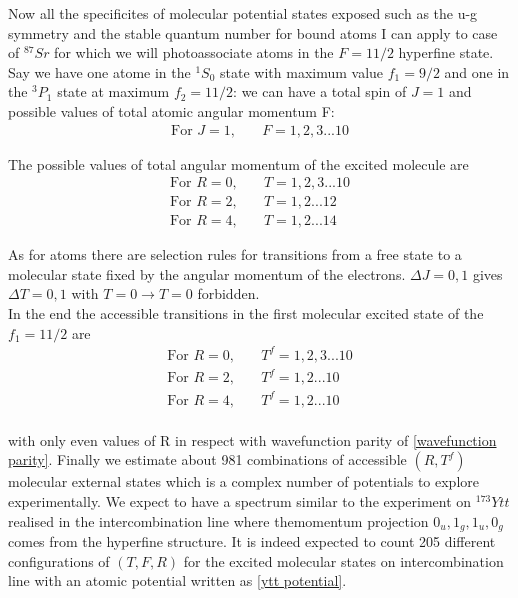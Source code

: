Now all the specificites of molecular potential states exposed such as the u-g symmetry and the stable quantum number for bound atoms
I can apply to case of $^{87}Sr$ for which we will photoassociate atoms in the $F=11/2$ hyperfine state. \\

Say we have one atome in the $^1S_0$ state with maximum value $f_1=9/2$ and one in the $^3P_1$ state at maximum $f_2=11/2$: we can have 
a total spin of $J = 1$ and possible values of total atomic angular momentum F:
\begin{align}
\text{For } J=1, &\quad {F = 1, 2, 3... 10}
\end{align}

The possible values of total angular momentum of the excited molecule are 
\begin{align}
\text{For } R=0, &\quad {T = 1, 2, 3... 10}\\
\text{For } R=2, &\quad {T = 1,2... 12}\\
\text{For } R=4, &\quad {T = 1,2 ... 14}
\end{align}

As for atoms there are selection rules for transitions from a free state to a molecular state
fixed by the angular momentum of the electrons. 
$\Delta J = 0, 1$ gives $\Delta T = 0, 1$ with $T=0 \rightarrow T=0$ forbidden.\\
In the end the accessible transitions in the first molecular excited state of the $f_1=11/2$ are
\begin{align}
\text{For } R=0, &\quad {T^f = 1, 2, 3... 10}\\
\text{For } R=2, &\quad {T^f = 1,2... 10}\\
\text{For } R=4, &\quad {T^f = 1,2 ... 10}\\
\end{align}

with only even values of R in respect with wavefunction parity of \ref{wavefunction parity}.
Finally we estimate about 981 combinations of accessible $(R,T^f)$ molecular external states
which is a complex number of potentials to explore experimentally. We expect to have a spectrum
similar to the experiment on $^{173}Ytt$ \cite{han_photoassociation_2018} realised in the intercombination
line where themomentum projection $0_u, 1_g, 1_u, 0_g$ comes from the hyperfine structure. It is indeed expected 
to count 205 different configurations of $(T, F, R)$ for the excited molecular states on intercombination line with an
atomic potential written as \ref{ytt potential}. 

